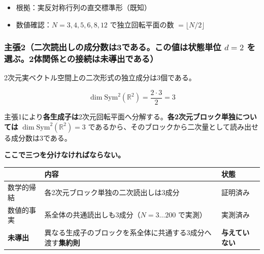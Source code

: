 \documentclass[
  10pt,
]{ltjsarticle}
\newcounter{none} %
\providecommand{\tightlist}{%
  \setlength{\itemsep}{0pt}\setlength{\parskip}{0pt}}
\begin{document}
\begin{itemize}
\tightlist
\item
  根拠：実反対称行列の直交標準形（既知）
\item
  数値確認：\(N=3,4,5,6,8,12\) で独立回転平面の数
  \(=\lfloor N/2\rfloor\)
\end{itemize}

\subsubsection{\texorpdfstring{主張2（二次読出しの成分数は3である。この値は状態単位
\(d=2\)
を選ぶ。2体関係との接続は未導出である）}{主張2（二次読出しの成分数は3である。この値は状態単位 d=2 を選ぶ。2体関係との接続は未導出である）}}\label{ux4e3bux5f352ux4e8cux6b21ux8aadux51faux3057ux306eux6210ux5206ux6570ux306f3ux3067ux3042ux308bux3053ux306eux5024ux306fux72b6ux614bux5358ux4f4d-d2-ux3092ux9078ux30762ux4f53ux95a2ux4fc2ux3068ux306eux63a5ux7d9aux306fux672aux5c0eux51faux3067ux3042ux308b}

2次元実ベクトル空間上の二次形式の独立成分は3個である。

\[\dim\mathrm{Sym}^2(\mathbb{R}^2) = \frac{2\cdot3}{2} = 3\]

主張1により\textbf{各生成子は}2次元回転平面へ分解する。\textbf{各2次元ブロック単独については}
\(\dim\mathrm{Sym}^2(\mathbb{R}^2) = 3\)
であるから、そのブロックから二次量として読み出せる成分数は3である。

\textbf{ここで三つを分けなければならない。}

{\def\LTcaptype{none} %
\begin{longtable}[]{@{}
  >{\raggedright\arraybackslash}p{}
  >{\raggedright\arraybackslash}p{}
  >{\raggedright\arraybackslash}p{}@{}}
\toprule\noalign{}
\begin{minipage}[b]{\linewidth}\raggedright
\end{minipage} & \begin{minipage}[b]{\linewidth}\raggedright
内容
\end{minipage} & \begin{minipage}[b]{\linewidth}\raggedright
状態
\end{minipage} \\
\midrule\noalign{}
\endhead
\bottomrule\noalign{}
\endlastfoot
数学的帰結 & 各2次元ブロック単独の二次読出しは3成分 & 証明済み \\
数値的事実 & 系全体の共通読出しも3成分（\(N=3\dots200\) で実測） &
実測済み \\
\textbf{未導出} &
異なる生成子のブロックを系全体に共通する3成分へ渡す\textbf{集約則} &
\textbf{与えていない} \\
\end{longtable}
}
\end{document}
